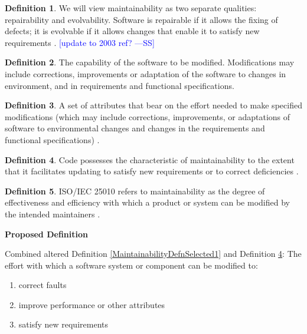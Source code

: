 \documentclass[letterpaper, cleveref]{lipics-v2019}
\newcommand{\authornote}[3]{\textcolor{#1}{[#3 ---#2]}}
\newcommand{\authornote}[3]{}
\newcommand{\wss}[1]{\authornote{blue}{SS}{#1}} %
\theoremstyle{definition}
\newtheorem{defn}{Definition}
\begin{document}
\begin{defn}
  We will view maintainability as two separate qualities: repairability and
  evolvability. Software is repairable if it allows the fixing of defects;
  it is evolvable if it allows changes that enable it to satisfy new
  requirements \citep{ghezzi1991fundamentals}. \wss{update to 2003 ref?}
\end{defn}

\begin{defn}
  The capability of the software to be modified.  Modifications may include
  corrections, improvements or adaptation of the software to changes in
  environment, and in requirements and functional specifications.
  \cite{ISO9126} %
\end{defn}

\begin{defn}
  A set of attributes that bear on the effort needed to make specified
  modifications (which may include corrections, improvements, or adaptations of
  software to environmental changes and changes in the requirements and
  functional specifications) \citep{pfleeger2006software}.
\end{defn}

\begin{defn} \label{MaintainabilityDefnSelected2}
  Code possesses the characteristic of maintainability to the extent that it
  facilitates updating to satisfy new requirements or to correct deficiencies
  \citep{boehm2007software}.
\end{defn}

\begin{defn}
  ISO/IEC 25010 refers to maintainability as the degree of effectiveness and
  efficiency with which a product or system can be modified by the intended
  maintainers \citep{ISO/IEC25010}. %
\end{defn}

\noindent \textbf{Proposed Definition}

Combined altered Definition \ref{MaintainabilityDefnSelected1} and Definition
\ref{MaintainabilityDefnSelected2}: The effort with which a software system or
component can be modified to:

\begin{enumerate}
	\item correct faults
	\item improve performance or other
	attributes
	\item satisfy new requirements
\end{enumerate}
\end{document}
